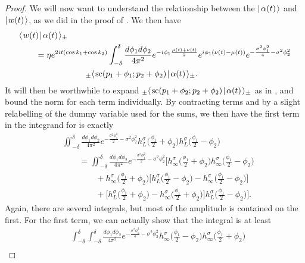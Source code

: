 \documentclass[../thesis-main/thesis-main]{subfiles}
\begin{document}
\begin{proof}
We will now want to understand the relationship between the $|\mspace{2mu} \alpha(t) \mspace{2mu} \rangle$ and $|\mspace{2mu} w(t) \mspace{2mu} \rangle$, as we did in the proof of .  We then have
\begin{align}
&\langle\mspace{2mu} w(t) \mspace{2mu} | \mspace{2mu} \alpha(t)\mspace{2mu} \rangle_{\pm} \nonumber\\
&\qquad = \eta e^{2it(\cos k_1 + \cos k_2)}\int_{-\delta}^\delta \frac{d\phi_1 d\phi_2}{4\pi^2} e^{-i \phi_1 \frac{\mu(t) + \nu(t)}{2}} e^{i \phi_1(\nu(t) - \mu(t))} e^{-\frac{\sigma^2 \phi_1^2}{4} - \sigma^2 \phi_2^2}\nonumber\\
&\qquad\qquad\qquad\qquad {}_\pm\langle\mspace{2mu} \text{sc}(p_1+\phi_1;p_2+\phi_2) \mspace{2mu} | \mspace{2mu} \alpha(t)\mspace{2mu} \rangle_\pm.\label{eq:w_alpha_ip}
\end{align}
It will then be worthwhile to expand ${}_\pm\langle\mspace{2mu} \text{sc}(p_1+\phi_2;p_2+\phi_2) \mspace{2mu} | \mspace{2mu} \alpha(t)\mspace{2mu} \rangle_\pm$ as in , and bound the norm for each term individually.   By contracting terms and by a slight relabelling of the dummy variable used for the sums, we then have the first term in the integrand for  is exactly
\begin{align}
  &\iint_{-\delta}^\delta \frac{d\phi_1 d\phi_2}{4\pi^2}e^{-\frac{\sigma^2\phi_1^2}{2} - \sigma^2 \phi_2^2} h_L^\sigma\Big(\frac{\phi_1}{2} + \phi_2\Big)h_L^\sigma\Big(\frac{\phi_1}{2} - \phi_2\Big)\\
  &\qquad = \iint_{-\delta}^\delta \frac{d\phi_1 d\phi_2}{4\pi^2}e^{-\frac{\sigma^2\phi_1^2}{2} - \sigma^2 \phi_2^2} \bigg[h_\infty^\sigma\Big(\frac{\phi_1}{2} + \phi_2\Big)h_\infty^\sigma\Big(\frac{\phi_1}{2} - \phi_2\Big)\nonumber\\
  &\qquad\qquad + h_\infty^\sigma\Big(\frac{\phi_1}{2} + \phi_2\Big)\bigg[h_L^\sigma\Big(\frac{\phi_1}{2} - \phi_2\Big) - h_\infty^\sigma\Big(\frac{\phi_1}{2} - \phi_2\Big)\bigg]\nonumber\\
  &\qquad\qquad + \bigg[h_L^\sigma\Big(\frac{\phi_1}{2} + \phi_2\Big) - h_\infty^\sigma\Big(\frac{\phi_1}{2} + \phi_2\Big)\bigg]h_L^\sigma\Big(\frac{\phi_1}{2} - \phi_2\Big)\bigg]\label{eq:w_alpha_important}.
\end{align}
Again, there are several integrals, but most of the amplitude is contained on the first.  For the first term, we can actually show that the integral is at least
\begin{align}
  &\int_{-\delta}^\delta \int_{-\delta}^{\delta} \frac{ d\phi_1 d\phi_2}{4\pi^2} e^{ - \frac{\sigma^2\phi_1^2}{4} - \sigma^2 \phi_2^2} h_\infty^\sigma \Big(\frac{\phi_1}{2} - \phi_2\Big) h_\infty^\sigma \Big( \frac{\phi_1}{2} + \phi_2\Big)\nonumber\\

\end{align}
\end{proof}
\end{document}
